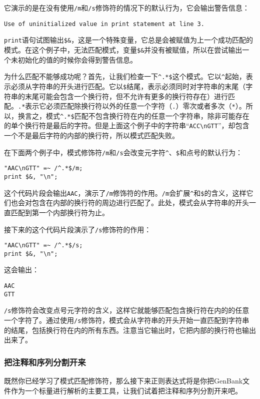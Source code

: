 它演示的是在没有使用\verb|/m|和\verb|/s|修饰符的情况下的默认行为，它会输出警告信息：

\begin{lstlisting}
Use of uninitialized value in print statement at line 3.
\end{lstlisting}

\verb|print|语句试图输出\verb|$&|，这是一个特殊变量，它总是会被赋值为上一个成功匹配的模式。在这个例子中，无法匹配模式，变量\verb|$&|并没有被赋值，所以在尝试输出一个未初始化的值的时候你会得到警告信息。

为什么匹配不能够成功呢？首先，让我们检查一下\verb|^.*$|这个模式。它以\verb|^|起始，表示必须从字符串的开头进行匹配。它以\verb|$|结尾，表示必须同时对字符串的末尾（字符串的末尾可能会包含一个换行符，但不允许有更多的换行符存在）进行匹配。\verb|.*|表示它必须匹配除换行符以外的任意一个字符（\verb|.|）零次或者多次（\verb|*|）。所以，换言之，模式\verb|^.*$|匹配不包含换行符在内的任意一个字符串，除非可能存在的单个换行符是最后的字符。但是上面这个例子中的字符串“\verb|ACC\nGTT|”，却包含一个不是最后字符的内部的换行符，所以模式匹配失败。

在下面两个例子中，模式修饰符\verb|/m|和\verb|/s|会改变元字符\verb|^|、\verb|$|和点号的默认行为：

\begin{lstlisting}
"AAC\nGTT" =~ /^.*$/m;
print $&, "\n";
\end{lstlisting}

这个代码片段会输出\verb|AAC|，演示了\verb|/m|修饰符的作用。\verb|/m|会扩展\verb|^|和\verb|$|的含义，这样它们也会对包含在内部的换行符的周边进行匹配了。此处，模式会从字符串的开头一直匹配到第一个内部换行符为止。

接下来的这个代码片段演示了\verb|/s|修饰符的作用：

\begin{lstlisting}
"AAC\nGTT" =~ /^.*$/s;
print $&, "\n";
\end{lstlisting}

这会输出：

\begin{lstlisting}
AAC
GTT
\end{lstlisting}

\verb|/s|修饰符会改变点号元字符的含义，这样它就能够匹配包含换行符在内的的任意一个字符了。通过使用\verb|/s|修饰符，模式会从字符串的开头开始一直匹配到字符串的结尾，包括换行符在内的所有东西。注意当它输出时，它把内部的换行符也输出出来了。

\subsubsection{把注释和序列分割开来}
既然你已经学习了模式匹配修饰符，那么接下来正则表达式将是你把GenBank文件作为一个标量进行解析的主要工具，让我们试着把注释和序列分割开来吧。

